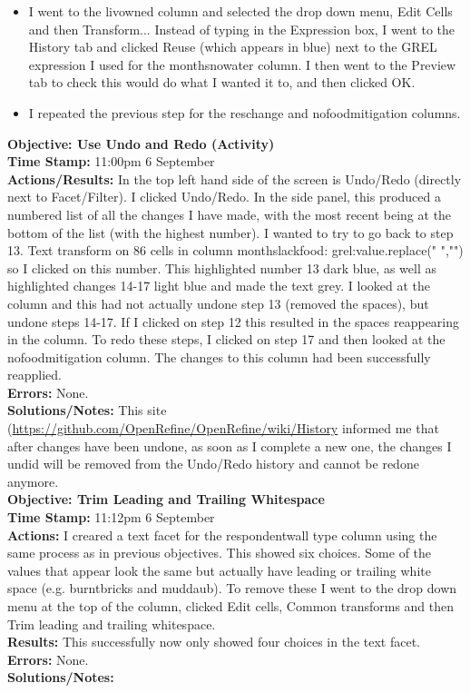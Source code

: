 \documentclass{article}
\begin{document}
\begin{FlushLeft}
\begin{itemize}
    \item I went to the liv\textunderscore owned column and selected the drop down menu, Edit Cells and then Transform... Instead of typing in the Expression box, I went to the History tab and clicked Reuse (which appears in blue) next to the GREL expression I used for the months\textunderscore no\textunderscore water column. I then went to the Preview tab to check this would do what I wanted it to, and then clicked OK.
    \item I repeated the previous step for the res\textunderscore change and no\textunderscore food\textunderscore mitigation columns.
\end{itemize}
\vspace{5mm}    
\textbf{Objective: Use Undo and Redo (Activity)}\\ 
\textbf{Time Stamp:} 11:00pm 6 September\\
\textbf{Actions/Results:} In the top left hand side of the screen is Undo/Redo (directly next to Facet/Filter). I clicked Undo/Redo. In the side panel, this produced a numbered list of all the changes I have made, with the most recent being at the bottom of the list (with the highest number). I wanted to try to go back to step 13. Text transform on 86 cells in column months\textunderscore lack\textunderscore food: grel:value.replace(" ","") so I clicked on this number. This highlighted number 13 dark blue, as well as highlighted changes 14-17 light blue and made the text grey. I looked at the column and this had not actually undone step 13 (removed the spaces), but undone steps 14-17. If I clicked on step 12 this resulted in the spaces reappearing in the column. To redo these steps, I clicked on step 17 and then looked at the no\textunderscore food\textunderscore mitigation column. The changes to this column had been successfully reapplied.\\
\textbf{Errors:} None.\\
\textbf{Solutions/Notes:} This site (\url{https://github.com/OpenRefine/OpenRefine/wiki/History} informed me that after changes have been undone, as soon as I complete a new one, the changes I undid will be removed from the Undo/Redo history and cannot be redone anymore.\\
\vspace{5mm}
\textbf{Objective: Trim Leading and Trailing Whitespace}\\
\textbf{Time Stamp:} 11:12pm 6 September \\
\textbf{Actions:} I creared a text facet for the respondent\textunderscore wall \textunderscore type column using the same process as in previous objectives. This showed six choices. Some of the values that appear look the same but actually have leading or trailing white space (e.g. burntbricks and muddaub). To remove these I went to the drop down menu at the top of the column, clicked Edit cells, Common transforms and then Trim leading and trailing whitespace. \\
\textbf{Results:} This successfully now only showed four choices in the text facet. \\
\textbf{Errors:} None.\\
\textbf{Solutions/Notes:}\\


\end{FlushLeft}
\end{document}
